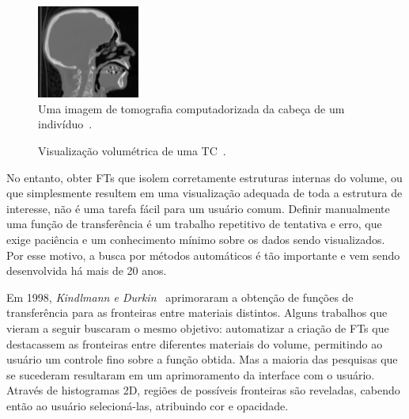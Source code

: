 \begin{figure}[h]
	\centering
	\includegraphics[width=0.3\textwidth]{images/head_ct_slice_intro}
    \caption{Uma imagem de tomografia computadorizada da cabeça de um indivíduo~\cite{gordonms}.}
    \label{fig:head_ct_slice_intro}
\end{figure}
\begin{figure}[h]
	\centering
    \caption{Visualização volumétrica de uma TC~\cite{gordonms}.}
    \label{fig:head_skull_intro}
\end{figure}
    
    No entanto, obter FTs que isolem corretamente estruturas internas do volume, ou que simplesmente resultem em uma visualização adequada de toda a estrutura de interesse, não é uma tarefa fácil para um usuário comum. Definir manualmente uma função de transferência é um trabalho repetitivo de tentativa e erro, que exige paciência e um conhecimento mínimo sobre os dados sendo visualizados. Por esse motivo, a busca por métodos automáticos é tão importante e vem sendo desenvolvida há mais de 20 anos.
    
    Em 1998, \textit{Kindlmann e Durkin}~\cite{gordon} aprimoraram a obtenção de funções de transferência para as fronteiras entre materiais distintos. Alguns trabalhos que vieram a seguir buscaram o mesmo objetivo: automatizar a criação de FTs que destacassem as fronteiras entre diferentes materiais do volume, permitindo ao usuário um controle fino sobre a função obtida. Mas a maioria das pesquisas que se sucederam resultaram em um aprimoramento da interface com o usuário. Através de histogramas 2D, regiões de possíveis fronteiras são reveladas, cabendo então ao usuário selecioná-las, atribuindo cor e opacidade.
    
